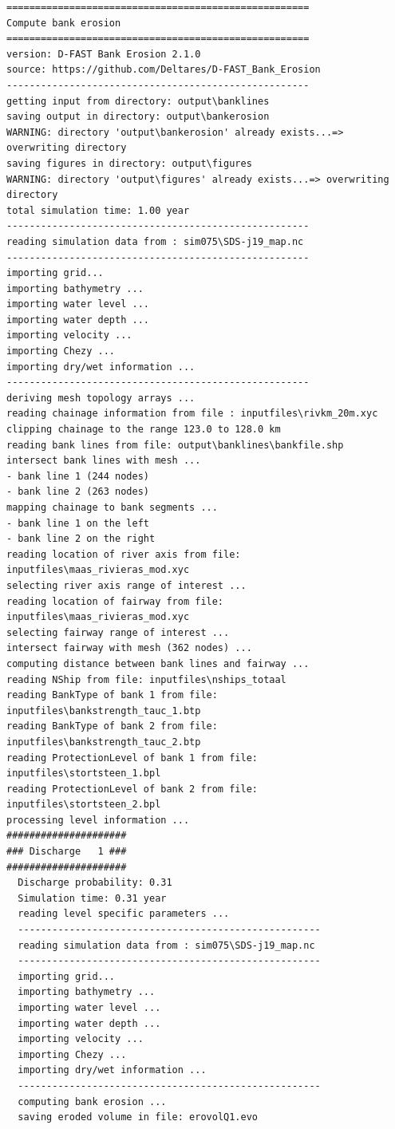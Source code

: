 \begin{Verbatim}
=====================================================
Compute bank erosion
=====================================================
version: D-FAST Bank Erosion 2.1.0
source: https://github.com/Deltares/D-FAST_Bank_Erosion
-----------------------------------------------------
getting input from directory: output\banklines
saving output in directory: output\bankerosion
WARNING: directory 'output\bankerosion' already exists...=> overwriting directory
saving figures in directory: output\figures
WARNING: directory 'output\figures' already exists...=> overwriting directory
total simulation time: 1.00 year
-----------------------------------------------------
reading simulation data from : sim075\SDS-j19_map.nc
-----------------------------------------------------
importing grid...
importing bathymetry ...
importing water level ...
importing water depth ...
importing velocity ...
importing Chezy ...
importing dry/wet information ...
-----------------------------------------------------
deriving mesh topology arrays ...
reading chainage information from file : inputfiles\rivkm_20m.xyc
clipping chainage to the range 123.0 to 128.0 km
reading bank lines from file: output\banklines\bankfile.shp
intersect bank lines with mesh ...
- bank line 1 (244 nodes)
- bank line 2 (263 nodes)
mapping chainage to bank segments ...
- bank line 1 on the left
- bank line 2 on the right
reading location of river axis from file: inputfiles\maas_rivieras_mod.xyc
selecting river axis range of interest ...
reading location of fairway from file: inputfiles\maas_rivieras_mod.xyc
selecting fairway range of interest ...
intersect fairway with mesh (362 nodes) ...
computing distance between bank lines and fairway ...
reading NShip from file: inputfiles\nships_totaal
reading BankType of bank 1 from file: inputfiles\bankstrength_tauc_1.btp
reading BankType of bank 2 from file: inputfiles\bankstrength_tauc_2.btp
reading ProtectionLevel of bank 1 from file: inputfiles\stortsteen_1.bpl
reading ProtectionLevel of bank 2 from file: inputfiles\stortsteen_2.bpl
processing level information ...
#####################
### Discharge   1 ###
#####################
  Discharge probability: 0.31
  Simulation time: 0.31 year
  reading level specific parameters ...
  -----------------------------------------------------
  reading simulation data from : sim075\SDS-j19_map.nc
  -----------------------------------------------------
  importing grid...
  importing bathymetry ...
  importing water level ...
  importing water depth ...
  importing velocity ...
  importing Chezy ...
  importing dry/wet information ...
  -----------------------------------------------------
  computing bank erosion ...
  saving eroded volume in file: erovolQ1.evo


\end{Verbatim}
